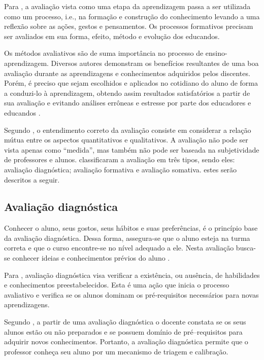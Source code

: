 Para , a avaliação vista como uma etapa da aprendizagem passa a ser utilizada como um processo, i.e., na formação e construção do conhecimento levando a uma reflexão sobre as ações, gestos e pensamentos. Os processos formativos precisam ser avaliados em sua forma, efeito, método e evolução dos educandos.

Os métodos avaliativos são de suma importância no processo de ensino-aprendizagem. Diversos autores demonstram os benefícios resultantes de uma boa avaliação durante as aprendizagens e conhecimentos adquiridos pelos discentes. Porém, é preciso que sejam escolhidos e aplicados no cotidiano do aluno de forma a conduzi-lo à aprendizagem, obtendo assim resultados satisfatórios a partir de sua avaliação e evitando análises errôneas e estresse por parte dos educadores e educandos \cite{da2014alunos}.

Segundo , o entendimento correto da avaliação consiste em considerar a relação mútua entre os aspectos quantitativos e qualitativos. A avaliação não pode ser vista apenas como ``medida'', mas também não pode ser baseada na subjetividade de professores e alunos.  classificaram a avaliação em três tipos, sendo eles: avaliação diagnóstica; avaliação formativa e avaliação somativa. estes serão descritos a seguir.

\subsection{Avaliação diagnóstica}
\label{sec:AvaDiag}
Conhecer o aluno, seus gostos, seus hábitos e suas preferências, é o princípio base da avaliação diagnóstica. Dessa forma, assegura-se que o aluno esteja na turma correta e que o curso encontre-se no nível adequado a ele. Nesta avaliação busca-se conhecer ideias e conhecimentos prévios do aluno \cite{masetto1994didatica}.

Para , avaliação diagnóstica visa verificar a existência, ou ausência, de habilidades e conhecimentos preestabelecidos. Esta é uma ação que inicia o processo avaliativo e verifica se os alunos dominam os pré‐requisitos necessários para novas aprendizagens.

Segundo , a partir de uma avaliação diagnóstica o docente constata se os seus alunos estão ou não preparados e se possuem domínio de pré–requisitos para adquirir novos conhecimentos. Portanto, a avaliação diagnóstica permite que o professor conheça seu aluno por um mecanismo de triagem e calibração.

